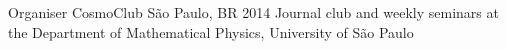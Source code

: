 \begin{cventries}
  \cventry
    {Organiser} %
    {CosmoClub} %
    {São Paulo, BR} %
    {2014} %
    {
        {Journal club and weekly seminars at the Department of Mathematical
Physics, University of São Paulo}
    }




\end{cventries}
